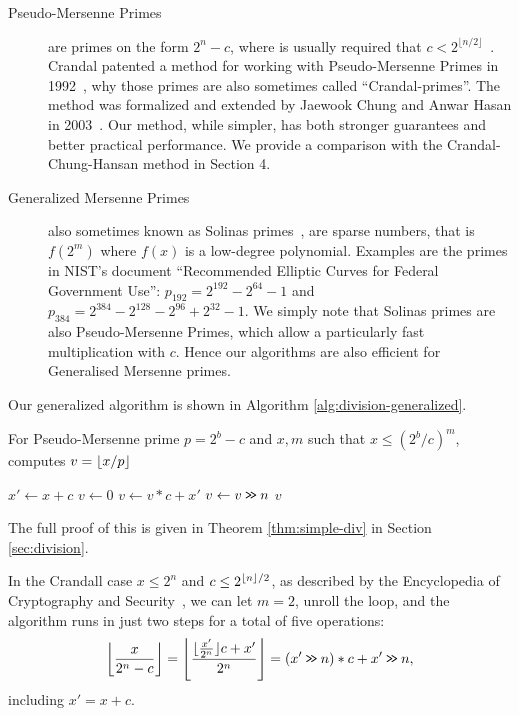 \begin{description}
   \item[Pseudo-Mersenne Primes]
      are primes on the form $2^n-c$, where is usually required that $c < 2^{\lfloor n/2\rfloor}$~\cite{van2014encyclopedia}.
      Crandal patented a method for working with Pseudo-Mersenne Primes in 1992~\cite{crandall1992method},
      why those primes are also sometimes called ``Crandal-primes''.
      The method was formalized and extended by Jaewook Chung and Anwar Hasan in 2003~\cite{chung2003more}.
      Our method, while simpler, has both stronger guarantees and better practical performance.
      We provide a comparison with the Crandal-Chung-Hansan method in Section 4.
   \item[Generalized Mersenne Primes]
      also sometimes known as Solinas primes~\cite{Solinas2011}, are sparse numbers, that is $f(2^m)$ where $f(x)$ is a low-degree polynomial.
      Examples are the primes in NIST's document ``Recommended Elliptic Curves for Federal Government Use'':
         $p_{192} = 2^{192} - 2^{64} - 1$
      and
         $p_{384} = 2^{384}-2^{128}-2^{96}+2^{32}-1$.
      We simply note that Solinas primes are also Pseudo-Mersenne Primes, which allow a particularly fast multiplication with $c$.
      Hence our algorithms are also efficient for Generalised Mersenne primes.
\end{description}

Our generalized algorithm is shown in Algorithm \ref{alg:division-generalized}.
\begin{algorithm}\label{alg:division-generalized}
   \caption{For Pseudo-Mersenne prime $p=2^b-c$ and $x,m$ such that $x\leq (2^b/c)^m$, computes
      $v=\lfloor {x/p} \rfloor$}
   \begin{algorithmic}[1]
         \State $x' \gets x + c$
         \State $v \gets 0$
            \State $v \gets v * c + x'$
            \State $v \gets v \mathbin{\texttt{>\!>}} n$
         \EndFor
         \State \Return $v$
      \EndProcedure
   \end{algorithmic}
\end{algorithm}
The full proof of this is given in Theorem \ref{thm:simple-div} in Section \ref{sec:division}.

In the Crandall case $x\le 2^n$ and $c\le 2^{\lfloor {n} \rfloor/2}$, as described by the Encyclopedia of Cryptography and Security~\cite{van2014encyclopedia}, we can let $m=2$, unroll the loop, and the algorithm runs in just two steps for a total of five operations:
   $$
   \left\lfloor\frac{x}{2^n-c}\right\rfloor
   = \left\lfloor\frac{\lfloor\frac{x'}{2^n}\rfloor c + x'}{2^n}\right\rfloor
      = (x' \mathbin{\texttt{>\!>}} n)*c + x' \mathbin{\texttt{>\!>}} n
   ,$$
   including $x'=x+c$.

